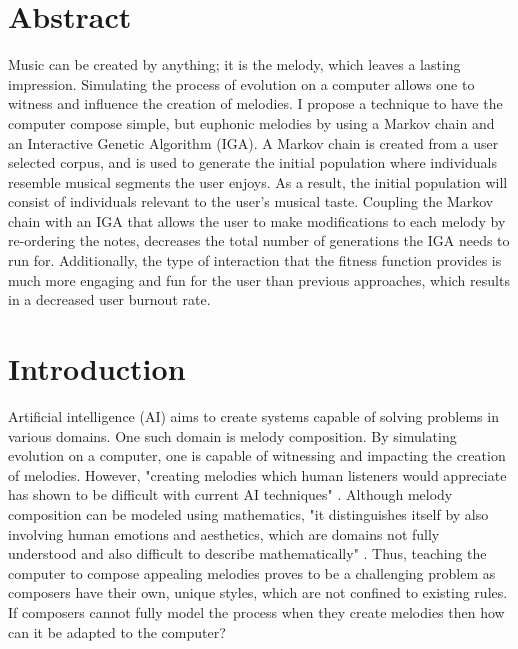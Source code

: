 \documentclass[12pt]{article} %
\begin{document}
\section{Abstract}
Music can be created by anything; it is the melody, which leaves a lasting impression. Simulating the process of evolution on a computer allows one to witness and influence the creation of melodies. I propose a technique to have the computer compose simple, but euphonic melodies by using a Markov chain and an Interactive Genetic Algorithm (IGA). A Markov chain is created from a user selected corpus, and is used to generate the initial population where individuals resemble musical segments the user enjoys. As a result, the initial population will consist of individuals relevant to the user's musical taste. Coupling the Markov chain with an IGA that allows the user to make modifications to each melody by re-ordering the notes, decreases the total number of generations the IGA needs to run for. Additionally, the type of interaction that the fitness function provides is much more engaging and fun for the user than previous approaches, which results in a decreased user burnout rate.

\newpage

\section{Introduction}
Artificial intelligence (AI) aims to create systems capable of solving problems in various domains. One such domain is melody composition. By simulating evolution on a computer, one is capable of witnessing and impacting the creation of melodies. However, "creating melodies which human listeners would appreciate has shown to be difficult with current AI techniques" \cite{Jensen}. Although melody composition can be modeled using mathematics, "it distinguishes itself by also involving human emotions and aesthetics, which are domains not fully understood and also difficult to describe mathematically" \cite{Jensen}. Thus, teaching the computer to compose appealing melodies proves to be a challenging problem as composers have their own, unique styles, which are not confined to existing rules. If composers cannot fully model the process when they create melodies then how can it be adapted to the computer? \\
\end{document}
